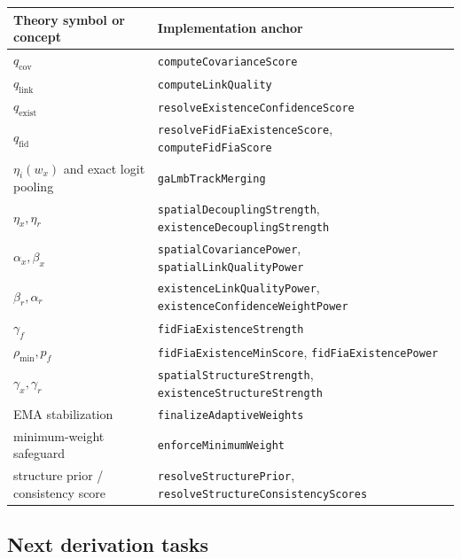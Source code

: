 \begin{center}
\begin{tabular}{ll}
\toprule
Theory symbol or concept & Implementation anchor \\
\midrule
$q_{\mathrm{cov}}$ & \texttt{computeCovarianceScore} \\
$q_{\mathrm{link}}$ & \texttt{computeLinkQuality} \\
$q_{\mathrm{exist}}$ & \texttt{resolveExistenceConfidenceScore} \\
$q_{\mathrm{fid}}$ & \texttt{resolveFidFiaExistenceScore}, \texttt{computeFidFiaScore} \\
$\eta_i(w_x)$ and exact logit pooling & \texttt{gaLmbTrackMerging} \\
$\eta_x,\eta_r$ & \texttt{spatialDecouplingStrength}, \texttt{existenceDecouplingStrength} \\
$\alpha_x,\beta_x$ & \texttt{spatialCovariancePower}, \texttt{spatialLinkQualityPower} \\
$\beta_r,\alpha_r$ & \texttt{existenceLinkQualityPower}, \texttt{existenceConfidenceWeightPower} \\
$\gamma_f$ & \texttt{fidFiaExistenceStrength} \\
$\rho_{\min},p_f$ & \texttt{fidFiaExistenceMinScore}, \texttt{fidFiaExistencePower} \\
$\gamma_x,\gamma_r$ & \texttt{spatialStructureStrength}, \texttt{existenceStructureStrength} \\
EMA stabilization & \texttt{finalizeAdaptiveWeights} \\
minimum-weight safeguard & \texttt{enforceMinimumWeight} \\
structure prior / consistency score & \texttt{resolveStructurePrior}, \texttt{resolveStructureConsistencyScores} \\
\bottomrule
\end{tabular}
\end{center}

\subsection*{Next derivation tasks}

